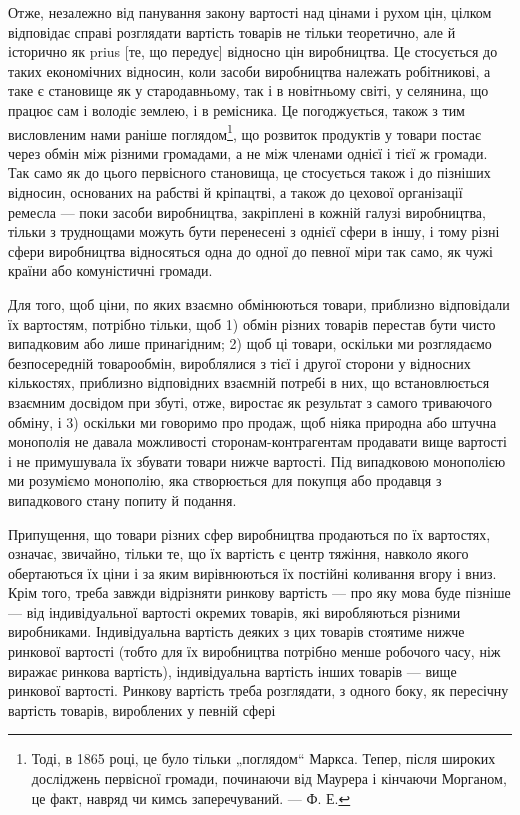 Отже, незалежно від панування закону вартості над цінами
і рухом цін, цілком відповідає справі розглядати вартість товарів
не тільки теоретично, але й історично як prius [те, що передує]
відносно цін виробництва. Це стосується до таких економічних
відносин, коли засоби виробництва належать робітникові,
а таке є становище як у стародавньому, так і в новітньому
світі, у селянина, що працює сам і володіє землею, і в ремісника.
Це погоджується, також з тим висловленим нами раніше
поглядом\footnote{
Тоді, в 1865 році, це було тільки „поглядом“ Маркса. Тепер, після широких
досліджень первісної громади, починаючи від Маурера і кінчаючи Морганом,
це факт, навряд чи кимсь заперечуваний. — Ф. Е.
}, що розвиток продуктів у товари постає через обмін
між різними громадами, а не між членами однієї і тієї ж громади.
Так само як до цього первісного становища, це стосується
також і до пізніших відносин, основаних на рабстві
й кріпацтві, а також до цехової організації ремесла — поки засоби
виробництва, закріплені в кожній галузі виробництва, тільки
з труднощами можуть бути перенесені з однієї сфери в іншу,
і тому різні сфери виробництва відносяться одна до одної
до певної міри так само, як чужі країни або комуністичні
громади.

Для того, щоб ціни, по яких взаємно обмінюються товари,
приблизно відповідали їх вартостям, потрібно тільки, щоб 1) обмін
різних товарів перестав бути чисто випадковим або лише
принагідним; 2) щоб ці товари, оскільки ми розглядаємо безпосередній
товарообмін, вироблялися з тієї і другої сторони у відносних
кількостях, приблизно відповідних взаємній потребі в них,
що встановлюється взаємним досвідом при збуті, отже, виростає
як результат з самого триваючого обміну, і 3) оскільки ми
говоримо про продаж, щоб ніяка природна або штучна монополія
не давала можливості сторонам-контрагентам продавати
вище вартості і не примушувала їх збувати товари нижче вартості.
Під випадковою монополією ми розуміємо монополію, яка створюється
для покупця або продавця з випадкового стану попиту
й подання.

Припущення, що товари різних сфер виробництва продаються
по їх вартостях, означає, звичайно, тільки те, що їх вартість
є центр тяжіння, навколо якого обертаються їх ціни і за яким
вирівнюються їх постійні коливання вгору і вниз. Крім того,
треба завжди відрізняти ринкову вартість — про яку мова буде
пізніше — від індивідуальної вартості окремих товарів, які виробляються
різними виробниками. Індивідуальна вартість деяких
з цих товарів стоятиме нижче ринкової вартості (тобто для їх
виробництва потрібно менше робочого часу, ніж виражає ринкова
вартість), індивідуальна вартість інших товарів — вище
ринкової вартості. Ринкову вартість треба розглядати, з одного
боку, як пересічну вартість товарів, вироблених у певній сфері